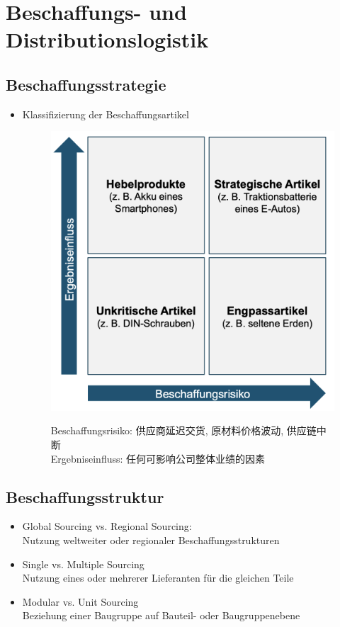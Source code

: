 \documentclass[12pt, letterpaper]{article}
\begin{document}
\begin{CJK*}{UTF8}{gbsn}
\begin{enumerate}
\end{enumerate}

\newpage

\section{Beschaffungs- und Distributionslogistik}
\subsection{Beschaffungsstrategie}
\begin{itemize}
\item Klassifizierung der Beschaffungsartikel\\
\begin{figure}[h!]
  \centering %
  \includegraphics[width=0.6\linewidth]{VL31.png}\\
   \caption*{Beschaffungsrisiko: 供应商延迟交货, 原材料价格波动, 供应链中断\\
   Ergebniseinfluss: 任何可影响公司整体业绩的因素}
\end{figure}
\end{itemize}

\subsection{Beschaffungsstruktur}
\begin{itemize}
\item Global Sourcing vs. Regional Sourcing:\\
Nutzung weltweiter oder regionaler Beschaffungsstrukturen\\
\item Single vs. Multiple Sourcing\\
Nutzung eines oder mehrerer Lieferanten für die gleichen Teile\\
\item Modular vs. Unit Sourcing\\
Beziehung einer Baugruppe auf Bauteil- oder Baugruppenebene
\end{itemize}


\end{CJK*}
\end{document}
